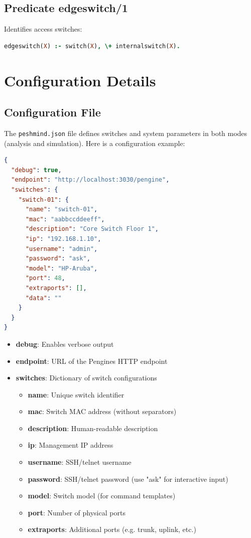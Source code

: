 \documentclass[12pt,a4paper]{article}
\begin{document}
\subsection{Predicate edgeswitch/1}

Identifies access switches:

\begin{lstlisting}[language=Prolog]
edgeswitch(X) :- switch(X), \+ internalswitch(X).
\end{lstlisting}

\section{Configuration Details}
\label{sec:conf}

\subsection{Configuration File}

The \texttt{peshmind.json} file defines switches and system parameters in both modes 
(analysis and simulation). Here is a configuration example:

\begin{lstlisting}[language=json]
{
  "debug": true,
  "endpoint": "http://localhost:3030/pengine",
  "switches": {
    "switch-01": {
      "name": "switch-01",
      "mac": "aabbccddeeff",
      "description": "Core Switch Floor 1",
      "ip": "192.168.1.10",
      "username": "admin",
      "password": "ask",
      "model": "HP-Aruba",
      "port": 48,
      "extraports": [],
      "data": ""
    }
  }
}
\end{lstlisting}

\begin{itemize}
    \item \textbf{debug}: Enables verbose output
    \item \textbf{endpoint}: URL of the Pengines HTTP endpoint
    \item \textbf{switches}: Dictionary of switch configurations
    \begin{itemize}
        \item \textbf{name}: Unique switch identifier
        \item \textbf{mac}: Switch MAC address (without separators)
        \item \textbf{description}: Human-readable description
        \item \textbf{ip}: Management IP address
        \item \textbf{username}: SSH/telnet username
        \item \textbf{password}: SSH/telnet password (use "ask" for interactive input)
        \item \textbf{model}: Switch model (for command templates)
        \item \textbf{port}: Number of physical ports
        \item \textbf{extraports}: Additional ports (e.g. trunk, uplink, etc.)
    \end{itemize}
\end{itemize}
\end{document}
